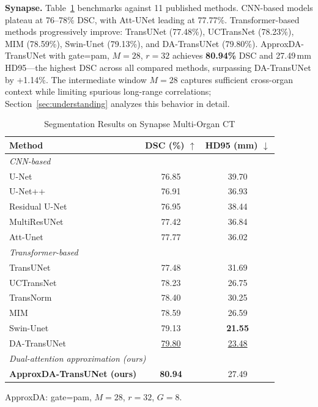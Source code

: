 \textbf{Synapse.} Table~\ref{tab:synapse} benchmarks against 11 published methods. CNN-based models plateau at 76--78\% DSC, with Att-UNet leading at 77.77\%. Transformer-based methods progressively improve: TransUNet (77.48\%), UCTransNet (78.23\%), MIM (78.59\%), Swin-Unet (79.13\%), and DA-TransUNet (79.80\%). ApproxDA-TransUNet with gate=pam, $M{=}28$, $r{=}32$ achieves \textbf{80.94\%} DSC and 27.49\,mm HD95---the highest DSC across all compared methods, surpassing DA-TransUNet by $+$1.14\%. The intermediate window $M{=}28$ captures sufficient cross-organ context while limiting spurious long-range correlations; Section~\ref{sec:understanding} analyzes this behavior in detail.

\begin{table}[ht]
  \caption{Segmentation Results on Synapse Multi-Organ CT}
  \label{tab:synapse}
  \centering
  \renewcommand{\arraystretch}{1.15}
  \setlength{\tabcolsep}{6pt}
  \begin{tabular}{lcc}
    \toprule
    Method & DSC (\%) $\uparrow$ & HD95 (mm) $\downarrow$ \\
    \midrule
    \multicolumn{3}{l}{\textit{CNN-based}} \\
    U-Net~\cite{ronneberger2015unet}              & 76.85 & 39.70 \\
    U-Net++~\cite{zhou2018unetpp}                 & 76.91 & 36.93 \\
    Residual U-Net~\cite{diakogiannis2020resunet} & 76.95 & 38.44 \\
    MultiResUNet~\cite{ibtehaz2020multiresunet}   & 77.42 & 36.84 \\
    Att-Unet~\cite{oktay2018attention}            & 77.77 & 36.02 \\
    \midrule
    \multicolumn{3}{l}{\textit{Transformer-based}} \\
    TransUNet~\cite{chen2021transunet}            & 77.48 & 31.69 \\
    UCTransNet~\cite{wang2022uctransnet}          & 78.23 & 26.75 \\
    TransNorm~\cite{azad2022transnorm}            & 78.40 & 30.25 \\
    MIM~\cite{wang2022mim}                        & 78.59 & 26.59 \\
    Swin-Unet~\cite{cao2022swinunet}              & 79.13 & \textbf{21.55} \\
    DA-TransUNet~\cite{sun2024datransunet}        & \underline{79.80} & \underline{23.48} \\
    \midrule
    \multicolumn{3}{l}{\textit{Dual-attention approximation (ours)}} \\
    \textbf{ApproxDA-TransUNet (ours)}     & \textbf{80.94} & 27.49 \\
    \bottomrule
  \end{tabular}
  \par\vspace{5pt}
  \parbox{\columnwidth}{\footnotesize ApproxDA: gate=pam, $M{=}28$, $r{=}32$, $G{=}8$.}
\end{table}

